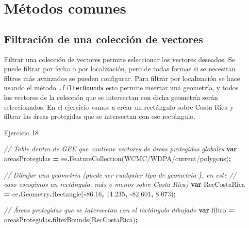 \documentclass[
  12pt,
  letterpaper,
  twoside]{book}
\newenvironment{Shaded}{\begin{snugshade}}{\end{snugshade}}
\newcommand{\AttributeTok}[1]{\textcolor[rgb]{0.77,0.63,0.00}{#1}}
\newcommand{\CommentTok}[1]{\textcolor[rgb]{0.56,0.35,0.01}{\textit{#1}}}
\newcommand{\FloatTok}[1]{\textcolor[rgb]{0.00,0.00,0.81}{#1}}
\newcommand{\FunctionTok}[1]{\textcolor[rgb]{0.00,0.00,0.00}{#1}}
\newcommand{\KeywordTok}[1]{\textcolor[rgb]{0.13,0.29,0.53}{\textbf{#1}}}
\newcommand{\NormalTok}[1]{#1}
\newcommand{\OperatorTok}[1]{\textcolor[rgb]{0.81,0.36,0.00}{\textbf{#1}}}
\newcommand{\StringTok}[1]{\textcolor[rgb]{0.31,0.60,0.02}{#1}}
\begin{document}
\hypertarget{muxe9todos-comunes-2}{%
\section{Métodos comunes}\label{muxe9todos-comunes-2}}

\hypertarget{filtraciuxf3n-de-una-colecciuxf3n-de-vectores}{%
\subsection{Filtración de una colección de vectores}\label{filtraciuxf3n-de-una-colecciuxf3n-de-vectores}}

Filtrar una colección de vectores permite seleccionar los vectores deseados. Se puede filtrar por fecha o por localización, pero de todas formas si se necesitan filtros más avanzados se pueden configurar. Para filtrar por localización se hace usando el método \texttt{.filterBounds} esto permite insertar una geometría, y todos los vectores de la colección que se intersectan con dicha geometría serán seleccionados. En el ejercicio vamos a crear un rectángulo sobre Costa Rica y filtrar las áreas protegidas que se intersectan con ese rectángulo.

Ejercicio 18

\begin{Shaded}
\begin{Highlighting}[]
\CommentTok{// Table dentro de GEE que contiene vectores de áreas protegidas globales}
\KeywordTok{var}\NormalTok{ areasProtegidas }\OperatorTok{=}\NormalTok{ ee}\OperatorTok{.}\FunctionTok{FeatureCollection}\NormalTok{(}\StringTok{\textquotesingle{}WCMC/WDPA/current/polygons\textquotesingle{}}\NormalTok{)}\OperatorTok{;} 

\CommentTok{// Dibujar una geometría (puede ser cualquier tipo de geometría \}, en este}
\CommentTok{// caso escogimos un rectángulo, más o menos sobre Costa Rica)}
\KeywordTok{var}\NormalTok{ RecCostaRica }\OperatorTok{=}\NormalTok{ ee}\OperatorTok{.}\AttributeTok{Geometry}\OperatorTok{.}\FunctionTok{Rectangle}\NormalTok{(}\OperatorTok{{-}}\FloatTok{86.16}\OperatorTok{,} \FloatTok{11.235}\OperatorTok{,} \OperatorTok{{-}}\FloatTok{82.601}\OperatorTok{,} \FloatTok{8.073}\NormalTok{)}\OperatorTok{;}

\CommentTok{// Áreas protegidas que se intersectan con el rectángulo dibujado}
\KeywordTok{var}\NormalTok{ filtro }\OperatorTok{=}\NormalTok{ areasProtegidas}\OperatorTok{.}\FunctionTok{filterBounds}\NormalTok{(RecCostaRica)}\OperatorTok{;}
\end{Highlighting}
\end{Shaded}
\end{document}

